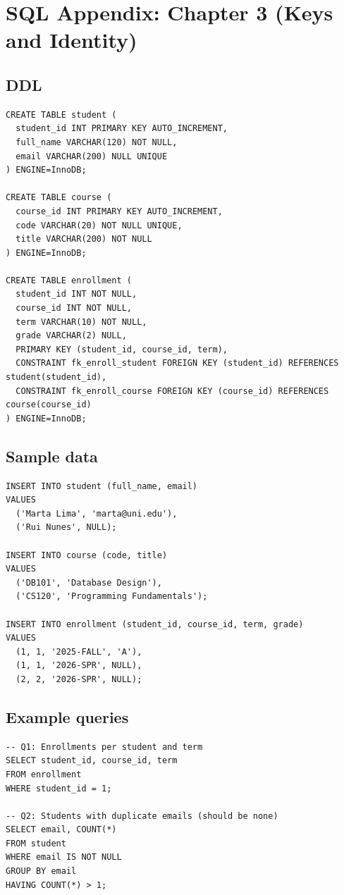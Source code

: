 \chapter{SQL Appendix: Chapter 3 (Keys and Identity)}

\section{DDL}
\begin{verbatim}
CREATE TABLE student (
  student_id INT PRIMARY KEY AUTO_INCREMENT,
  full_name VARCHAR(120) NOT NULL,
  email VARCHAR(200) NULL UNIQUE
) ENGINE=InnoDB;

CREATE TABLE course (
  course_id INT PRIMARY KEY AUTO_INCREMENT,
  code VARCHAR(20) NOT NULL UNIQUE,
  title VARCHAR(200) NOT NULL
) ENGINE=InnoDB;

CREATE TABLE enrollment (
  student_id INT NOT NULL,
  course_id INT NOT NULL,
  term VARCHAR(10) NOT NULL,
  grade VARCHAR(2) NULL,
  PRIMARY KEY (student_id, course_id, term),
  CONSTRAINT fk_enroll_student FOREIGN KEY (student_id) REFERENCES student(student_id),
  CONSTRAINT fk_enroll_course FOREIGN KEY (course_id) REFERENCES course(course_id)
) ENGINE=InnoDB;
\end{verbatim}

\section{Sample data}
\begin{verbatim}
INSERT INTO student (full_name, email)
VALUES
  ('Marta Lima', 'marta@uni.edu'),
  ('Rui Nunes', NULL);

INSERT INTO course (code, title)
VALUES
  ('DB101', 'Database Design'),
  ('CS120', 'Programming Fundamentals');

INSERT INTO enrollment (student_id, course_id, term, grade)
VALUES
  (1, 1, '2025-FALL', 'A'),
  (1, 1, '2026-SPR', NULL),
  (2, 2, '2026-SPR', NULL);
\end{verbatim}

\section{Example queries}
\begin{verbatim}
-- Q1: Enrollments per student and term
SELECT student_id, course_id, term
FROM enrollment
WHERE student_id = 1;

-- Q2: Students with duplicate emails (should be none)
SELECT email, COUNT(*)
FROM student
WHERE email IS NOT NULL
GROUP BY email
HAVING COUNT(*) > 1;
\end{verbatim}
